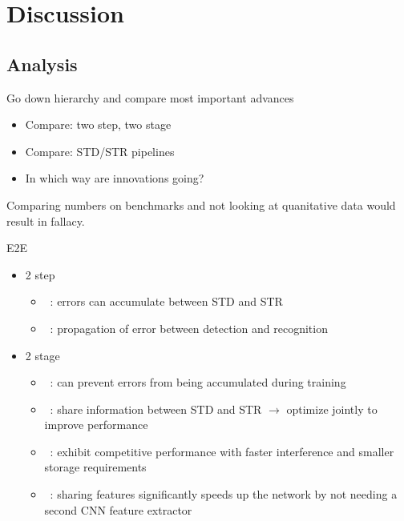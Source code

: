 \chapter{Discussion}\label{ch:discussion}
\section{Analysis}\label{se:analysis}
Go down hierarchy and compare most important advances
\begin{itemize}
    \item Compare: two step, two stage
    \item Compare: STD/STR pipelines
    \item In which way are innovations going?
\end{itemize}
Comparing numbers on benchmarks and not looking at quanitative data would result in fallacy.

E2E
\begin{itemize}
    \item 2 step
        \begin{itemize}
            \item~\cite{chen_text_2021}: errors can accumulate between STD and STR
            \item~\cite{long_scene_2021}: propagation of error between detection and recognition
        \end{itemize}
    \item 2 stage
        \begin{itemize}
            \item~\cite{chen_text_2021}: can prevent errors from being accumulated during training
            \item~\cite{chen_text_2021}: share information between STD and STR
                $\rightarrow$ optimize jointly to improve performance
            \item~\cite{chen_text_2021}: exhibit competitive performance with faster interference
                and smaller storage requirements
            \item~\cite{liu_fots_2018}: sharing features significantly speeds up the network
                by not needing a second \ac{CNN} feature extractor
        \end{itemize}
\end{itemize}

